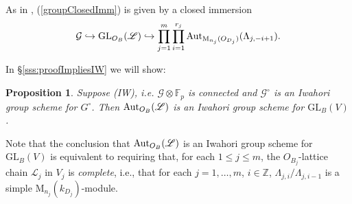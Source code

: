 \documentclass[reqno, 10pt]{amsart}
\newcommand{\BF}{\ensuremath{\mathbb {F}}\xspace}
\newcommand{\BZ}{\ensuremath{\mathbb {Z}}\xspace}
\newcommand{\CG}{\ensuremath{\mathcal {G}}\xspace}
\newcommand{\RM}{\ensuremath{\mathrm {M}}\xspace}
\newcommand{\GL}{\mathrm{GL}}
\newtheorem{proposition}[subsubsection]{Proposition}
\theoremstyle{definition}
\numberwithin{equation}{subsection}
\numberwithin{subsubsection}{subsection}
\begin{document}
As in \cite[App. to Ch. 3]{RZbook}, (\ref{groupClosedImm})
is given by a closed immersion
\begin{equation}\label{CLimm}
\CG\hookrightarrow \GL_{O_B}(\mathscr L)\hookrightarrow  \prod_{j=1}^m\prod_{i=1}^{r_j} {\rm Aut}_{\RM_{n_j }(O_{D_j})}(\Lambda_{j,-i+1}).
\end{equation}


In  \S \ref{sss:proofImpliesIW} we will show:


\begin{proposition}\label{impliesIW}
Suppose  (IW), i.e. $\CG\otimes \BF_p$ is connected and $\CG^\circ$ is 
an Iwahori group scheme for $G^\circ$. Then ${\rm Aut}_{O_B}(\mathscr L)$ is an Iwahori group scheme for
$\GL_B(V)$. 
\end{proposition}



Note that the conclusion that
${\rm Aut}_{O_B}(\mathscr L)$ is an Iwahori group scheme for
$\GL_B(V)$ is equivalent to requiring that, for each $1\leq j\leq m$, the $O_{B_j}$-lattice chain $\mathscr L_j$ in $V_j$ is \emph{complete},
i.e., that for each $j=1,\ldots, m$, $i\in \BZ$, $\Lambda_{j,i}/\Lambda_{j, i-1}$ is a simple $\RM_{n_j}(k_{D_j})$-module. 
 

 
\end{document}

